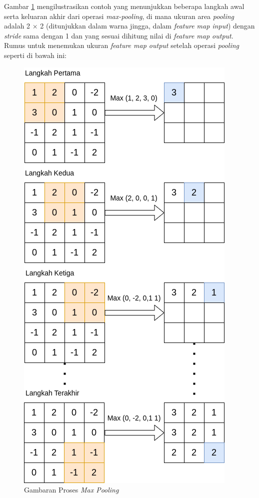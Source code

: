 Gambar \ref{fig:max-pooling} mengilustrasikan contoh yang menunjukkan beberapa langkah awal serta keluaran akhir dari operasi \textit{max-pooling}, di mana ukuran area \textit{pooling} adalah 2 $\times$ 2 (ditunjukkan dalam warna jingga, dalam \textit{feature map input}) dengan \textit{stride} sama dengan 1 dan yang sesuai dihitung nilai di \textit{feature map output}. Rumus untuk menemukan ukuran \textit{feature map output} setelah operasi \textit{pooling} seperti di bawah ini:

\begin{figure}[h!]
	\centering
	\includegraphics[scale=0.25]{gambar/max-pooling.png}
	\caption{Gambaran Proses \textit{Max Pooling}}
	\label{fig:max-pooling}
\end{figure}

